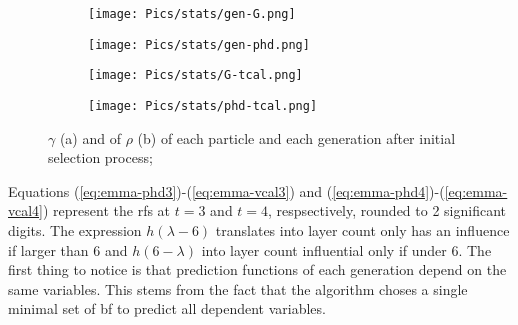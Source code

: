 \begin{figure}[hb]
    \centering
    \begin{subfigure}{.24\textwidth}
        \centering
        \texttt{[image: Pics/stats/gen-G.png]}
        \caption{} \label{fig:emma-G-gen}
    \end{subfigure}
    \begin{subfigure}{.24\textwidth}
        \centering
        \texttt{[image: Pics/stats/gen-phd.png]}
        \caption{} \label{fig:emma-phd-gen}
    \end{subfigure}
    \begin{subfigure}{.24\textwidth}
        \centering
        \texttt{[image: Pics/stats/G-tcal.png]}
        \caption{} \label{fig:g-tcal}
    \end{subfigure}
    \begin{subfigure}{.24\textwidth}
        \centering
        \texttt{[image: Pics/stats/phd-tcal.png]}
        \caption{} \label{fig:phd-tcal}
    \end{subfigure}
	\caption{$\gamma$ (a) and of $\rho$ (b) of each particle and each generation after initial selection process; } 
    \label{fig:emma-gen}
\end{figure}

Equations (\ref{eq:emma-phd3})-(\ref{eq:emma-vcal3}) and (\ref{eq:emma-phd4})-(\ref{eq:emma-vcal4}) represent the \gls{rf}s at $t=3$ and $t=4$, respsectively, rounded to 2 significant digits.
The expression $h(\lambda-6)$ translates into layer count only has an influence if larger than 6 
and $h(6-\lambda)$ into layer count influential only if under 6.
%
The first thing to notice is that prediction functions of each generation depend on the same variables. 
This stems from the fact that the algorithm choses a single minimal set of \gls{bf} to predict all dependent variables. 
%

